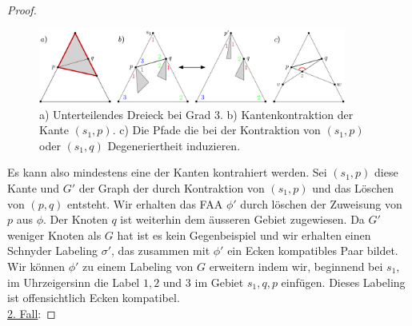 \begin{proof}
\begin{figure}[h]
	\centering
	  \includegraphics[width=0.9\textwidth]{lem3_1.png}
    	\caption{a) Unterteilendes Dreieck bei Grad 3. b) Kantenkontraktion der Kante $(s_1,p)$. c) Die Pfade die bei der Kontraktion von $(s_1,p)$ oder $(s_1,q)$ Degeneriertheit induzieren.}
    	\label{lem3_1}
\end{figure}

Es kann also mindestens eine der Kanten kontrahiert werden. Sei $(s_1,p)$ diese Kante und $G'$ der Graph der durch Kontraktion von $(s_1,p)$ und das Löschen von $(p,q)$ entsteht. Wir erhalten das FAA $\phi'$ durch löschen der Zuweisung von $p$ aus $\phi$. Der Knoten $q$ ist weiterhin dem äusseren Gebiet zugewiesen. Da $G'$ weniger Knoten als $G$ hat ist es kein Gegenbeispiel und wir erhalten einen Schnyder Labeling $\sigma'$, das zusammen mit $\phi'$ ein Ecken kompatibles Paar bildet. Wir können $\phi'$ zu einem Labeling von $G$ erweitern indem wir, beginnend bei $s_1$, im Uhrzeigersinn die Label $1,2$ und $3$ im Gebiet $s_1,q,p$ einfügen. Dieses Labeling ist offensichtlich Ecken kompatibel. \\

\underline{2. Fall}: 

\end{proof} 

